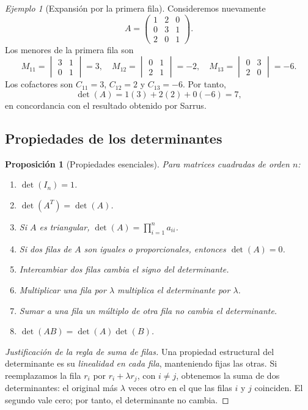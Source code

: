 \documentclass[12pt]{article}
\newtheorem{proposicion}[definicion]{Proposición}
\theoremstyle{remark}
\newtheorem{ejemplo}[definicion]{Ejemplo}
\begin{document}
\begin{ejemplo}[Expansión por la primera fila]
Consideremos nuevamente
\[
A=\begin{pmatrix}1&2&0\\0&3&1\\2&0&1\end{pmatrix}.
\]
Los menores de la primera fila son
\[
M_{11}=\begin{vmatrix}3&1\\0&1\end{vmatrix}=3,\quad
M_{12}=\begin{vmatrix}0&1\\2&1\end{vmatrix}=-2,\quad
M_{13}=\begin{vmatrix}0&3\\2&0\end{vmatrix}=-6.
\]
Los cofactores son $C_{11}=3$, $C_{12}=2$ y $C_{13}=-6$. Por tanto,
\[
\det(A)=1(3)+2(2)+0(-6)=\boxed{7},
\]
en concordancia con el resultado obtenido por Sarrus.
\end{ejemplo}

\subsection{Propiedades de los determinantes}
\begin{proposicion}[Propiedades esenciales]
Para matrices cuadradas de orden $n$:
\begin{enumerate}
\item $\det(I_n)=1$.
\item $\det(A^T)=\det(A)$.
\item Si $A$ es triangular, $\det(A)=\prod_{i=1}^{n}a_{ii}$.
\item Si dos filas de $A$ son iguales o proporcionales, entonces $\det(A)=0$.
\item Intercambiar dos filas cambia el signo del determinante.
\item Multiplicar una fila por $\lambda$ multiplica el determinante por $\lambda$.
\item Sumar a una fila un múltiplo de otra fila \emph{no cambia} el determinante.
\item $\det(AB)=\det(A)\det(B)$.
\end{enumerate}
\end{proposicion}

\begin{proof}[Justificación de la regla de suma de filas]
Una propiedad estructural del determinante es su \emph{linealidad en cada fila}, manteniendo fijas las otras. Si reemplazamos la fila $r_i$ por $r_i+\lambda r_j$, con $i\ne j$, obtenemos la suma de dos determinantes: el original más $\lambda$ veces otro en el que las filas $i$ y $j$ coinciden. El segundo vale cero; por tanto, el determinante no cambia.
\end{proof}
\end{document}
